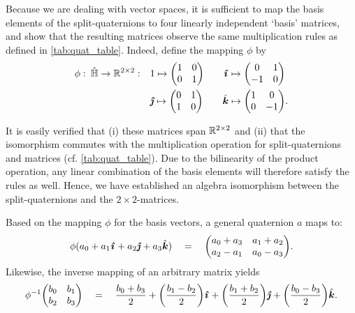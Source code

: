 Because we are dealing with vector spaces, it is sufficient to map the basis elements of the split-quaternions to four linearly independent `basis' matrices, and show that the resulting matrices observe the same multiplication rules as defined in \cref{tab:quat_table}. Indeed, define the mapping \(\phi\) by 
\begin{equation}
    \begin{split}
        \phi: \: \spquaternions \to \real^{2\times2}: \quad &  
         1 \mapsto  \mqty(1 & 0 \\ 0 & 1) \qquad
        \quati \mapsto  \mqty(0 & 1 \\  -1 & 0) \\
        & \quatj \mapsto  \mqty(0 & 1 \\  1 & 0)\qquad 
        \quatk \mapsto  \mqty(1 & 0 \\  0 & -1). \\
    \end{split}
    \label{eq:basis_elements}
\end{equation}

It is easily verified that (i) these matrices span \(\mathbb{R}^{2\times2}\) and (ii) that the isomorphism commutes with the multiplication operation for split-quaternions and matrices (cf. \cref{tab:quat_table}). Due to the bilinearity of the product operation, any linear combination of the basis elements will therefore satisfy the rules as well. Hence, we have established an algebra isomorphism between the split-quaternions and the \(2\times 2\)-matrices. 

Based on the mapping \(\phi\) for the basis vectors, a general quaternion $a$ maps to:
\begin{equation}
    \phi(\quat{a_0}{a_1}{a_2}{a_3}) \quad = \quad \mqty(a_0 + a_3 & a_1 + a_2 \\ a_2 - a_1 & a_0 - a_3). 
    \label{eq:quat_isom}
\end{equation}
Likewise, the inverse mapping of an arbitrary matrix yields
\begin{equation}
    \phi^{-1}\mqty(b_0 & b_1 \\ b_2 & b_3) \quad = \quad \quat{\frac{b_0 + b_3}{2}}{\qty(\frac{b_1 - b_2}{2})}{\qty(\frac{b_1 + b_2}{2})}{\qty(\frac{b_0 - b_3}{2})}. 
    \label{eq:inv_quat_isom}
\end{equation}

